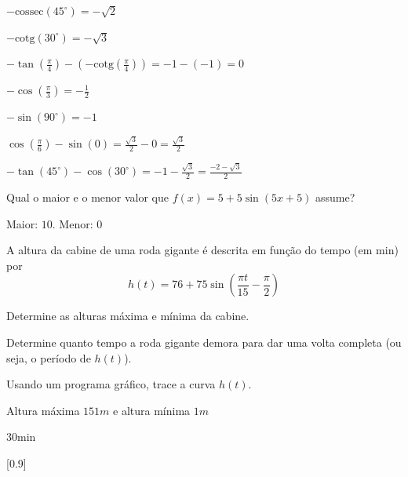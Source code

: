 \begin{exercises*}
\begin{exercise}
  \begin{answer}
    \begin{alphalist}
      \item $-\text{cossec}(45^{\circ}) = -\sqrt{2}$
      \item $-\text{cotg}(30^{\circ}) = -\sqrt{3}$
      \item $-\tan\left(\frac{\pi}{4}\right) -
            (-\text{cotg}\left(\frac{\pi}{4}\right)) = -1 - (-1) = 0$
      \item $-\cos\left(\frac{\pi}{3}\right) = -\frac{1}{2}$
      \item $-\sin(90^{\circ}) = -1$
      \item $\cos\left(\frac{\pi}{6}\right) - \sin(0) = \frac{\sqrt{3}}{2} - 0
            = \frac{\sqrt{3}}{2}$
      \item $-\tan(45^{\circ}) - \cos(30^{\circ}) = -1 - \frac{\sqrt{3}}{2} =
            \frac{-2-\sqrt{3}}{2}$
    \end{alphalist}
  \end{answer}
\end{exercise}

\begin{exercise}
  Qual o maior e o menor valor que $f(x) = 5+5\sin(5x+5)$ assume?

  \begin{answer}
    Maior: $10$. Menor: $0$
  \end{answer}
\end{exercise}

\begin{exercise}
  A altura da cabine de uma roda gigante é descrita em função do tempo (em min) por
  \[h(t)=76+75 \sin \left( \frac{\pi t}{15}- \frac{\pi}{2}\right)\]
  \begin{alphalist}
    \item Determine as alturas máxima e mínima da cabine.
    \item Determine quanto tempo a roda gigante demora para dar uma volta
          completa (ou seja, o período de $h(t)$).
    \item Usando um programa gráfico, trace a curva $h(t)$.
  \end{alphalist}

  \begin{answer}
    \begin{alphalist}
      \item Altura máxima $151m$ e altura mínima $1m$
      \item $30$min
      \item {}[0.9]
    \end{alphalist}
  \end{answer}
\end{exercise}


\end{exercises*}
